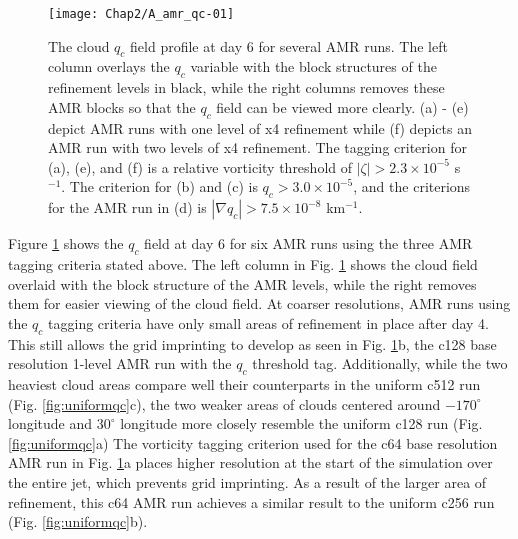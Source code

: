 \begin{figure}
   \centerline{%
   \noindent
   \texttt{[image: Chap2/A\_amr\_qc-01]}}
   \caption{The cloud $q_c$ field profile at day 6 for several AMR runs.  The left column overlays
   the $q_c$ variable with the block structures of the refinement levels in black, while the right columns
   removes these AMR blocks so that the $q_c$ field can be viewed more clearly. 
  (a) - (e) depict AMR runs with one level of x4 refinement while (f) depicts an AMR run with two levels
  of x4 refinement. The tagging criterion for (a), (e), and (f) is a relative vorticity threshold of
  $|\zeta| > 2.3 \times 10^{-5}$ s$^{-1}$. The criterion for (b) and (c) is $q_c > 3.0\times 10^{-5}$,
  and the criterions for the AMR run in (d) is $|\nabla q_c | > 7.5\times 10^{-8}$ km$^{-1}$.
   }
   \label{fig:amrqc}
\end{figure}

Figure \ref{fig:amrqc} shows the $q_c$ field at day 6 for six AMR runs using the three
AMR tagging criteria stated above. The left column in Fig.  \ref{fig:amrqc} shows the
cloud field overlaid with the block structure of the AMR levels, while the right removes
them for easier viewing of the cloud field. 
At coarser resolutions, AMR runs using the $q_c$ tagging criteria have only small 
areas of refinement in place after day 4. This still allows 
the grid imprinting to develop as seen in Fig. \ref{fig:amrqc}b, the c128 base resolution
1-level AMR run with the $q_c$ threshold tag. Additionally, while the two
heaviest cloud areas compare well their counterparts in the uniform c512 run (Fig. \ref{fig:uniformqc}c),
the two weaker areas of clouds centered around $-170^\circ$ longitude
and $30^\circ$ longitude more closely resemble the uniform c128 run (Fig. \ref{fig:uniformqc}a)
The vorticity tagging
criterion used for the c64 base resolution AMR run in Fig. \ref{fig:amrqc}a places higher resolution 
at the start of the simulation over the entire jet, which prevents grid imprinting.
As a result of the larger area of refinement, this c64 AMR run achieves a similar result to the
uniform c256 run (Fig. \ref{fig:uniformqc}b). 

